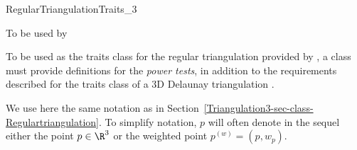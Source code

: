 

\begin{ccRefConcept}{RegularTriangulationTraits_3}

To be used by \protect 
{}

\ccDefinition

To be used as the traits class for the regular triangulation provided
by \cgal, a class must provide definitions for the \textit{power
tests},
in addition to the requirements described for the traits class of a 3D 
Delaunay triangulation .

We use here the same notation as in
Section~\ref{Triangulation3-sec-class-Regulartriangulation}. 
To simplify notation, $p$ will often denote in the sequel either the
point $p\in\R^3$ or the weighted point ${p}^{(w)}=(p,w_p)$.


\end{ccRefConcept}
